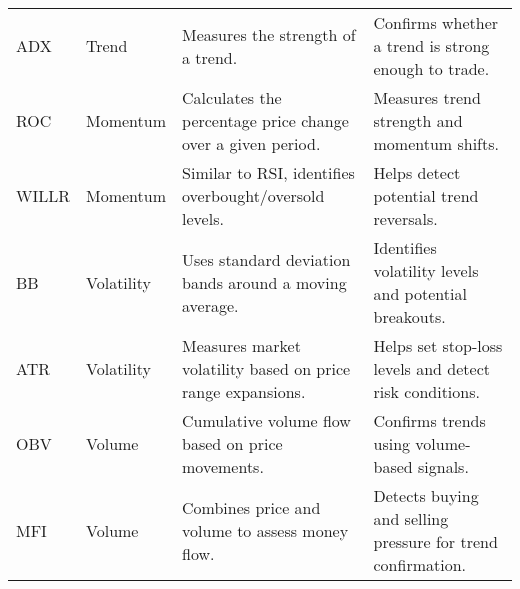 \begin{longtable}{llp{5cm}p{5cm}}
        ADX & Trend 
        & Measures the strength of a trend. 
        & Confirms whether a trend is strong enough to trade. \\
        ROC & Momentum 
        & Calculates the percentage price change over a given period. 
        & Measures trend strength and momentum shifts. \\
        WILLR & Momentum
        & Similar to RSI, identifies overbought/oversold levels. 
        & Helps detect potential trend reversals. \\
        BB & Volatility 
        & Uses standard deviation bands around a moving average. 
        & Identifies volatility levels and potential breakouts. \\
        ATR & Volatility 
        & Measures market volatility based on price range expansions. 
        & Helps set stop-loss levels and detect risk conditions. \\
        OBV & Volume 
        & Cumulative volume flow based on price movements. 
        & Confirms trends using volume-based signals. \\
        MFI & Volume
        & Combines price and volume to assess money flow. 
        & Detects buying and selling pressure for trend confirmation. \\
        \hline
\end{longtable}

